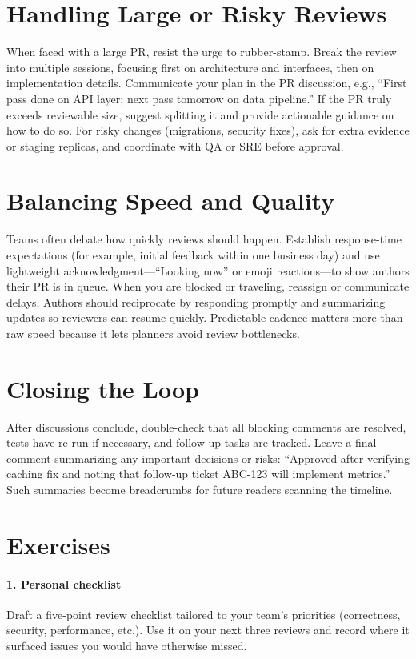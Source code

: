 \section{Handling Large or Risky Reviews}
When faced with a large PR, resist the urge to rubber-stamp. Break the review into multiple sessions, focusing first on architecture and interfaces, then on implementation details. Communicate your plan in the PR discussion, e.g., ``First pass done on API layer; next pass tomorrow on data pipeline.'' If the PR truly exceeds reviewable size, suggest splitting it and provide actionable guidance on how to do so. For risky changes (migrations, security fixes), ask for extra evidence or staging replicas, and coordinate with QA or SRE before approval.

\section{Balancing Speed and Quality}
Teams often debate how quickly reviews should happen. Establish response-time expectations (for example, initial feedback within one business day) and use lightweight acknowledgment---``Looking now'' or emoji reactions---to show authors their PR is in queue. When you are blocked or traveling, reassign or communicate delays. Authors should reciprocate by responding promptly and summarizing updates so reviewers can resume quickly. Predictable cadence matters more than raw speed because it lets planners avoid review bottlenecks.

\section{Closing the Loop}
After discussions conclude, double-check that all blocking comments are resolved, tests have re-run if necessary, and follow-up tasks are tracked. Leave a final comment summarizing any important decisions or risks: ``Approved after verifying caching fix and noting that follow-up ticket ABC-123 will implement metrics.'' Such summaries become breadcrumbs for future readers scanning the timeline.

\section*{Exercises}

\paragraph{1. Personal checklist} Draft a five-point review checklist tailored to your team's priorities (correctness, security, performance, etc.). Use it on your next three reviews and record where it surfaced issues you would have otherwise missed.

